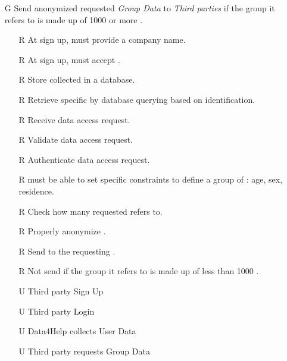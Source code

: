 \documentclass[../../../rasd.tex]{subfiles}
\begin{document}
\begin{itemize}
    \item[G\subs{3}]Send anonymized requested \textit{Group Data} to \textit{Third parties} if the group it refers to is made up of 1000 or more .
    \begin{itemize}
            \item[R\subs{3}]At sign up,  must provide a company name.
            \item[R\subs{5}]At sign up,  must accept .
        \item[R\subs{11}]Store collected  in a database.
        \item[R\subs{12}]Retrieve specific  by database querying based on  identification.
        \item[R\subs{13}]Receive  data access request.
        \item[R\subs{14}]Validate  data access request.
        \item[R\subs{15}]Authenticate  data access request.
        \item[R\subs{21}] must be able to set specific constraints to define a group of : age, sex, residence.
        \item[R\subs{22}]Check how many  requested  refers to.
        \item[R\subs{23}]Properly anonymize .
        \item[R\subs{24}]Send  to the requesting .
        \item[R\subs{25}]Not send  if the group it refers to is made up of less than 1000 .
        \\
        \item[U\subs{2}]Third party Sign Up
        \item[U\subs{4}]Third party Login
        \item[U\subs{5}]Data4Help collects User Data
        \item[U\subs{7}]Third party requests Group Data
    \end{itemize}


\end{itemize}
\end{document}
